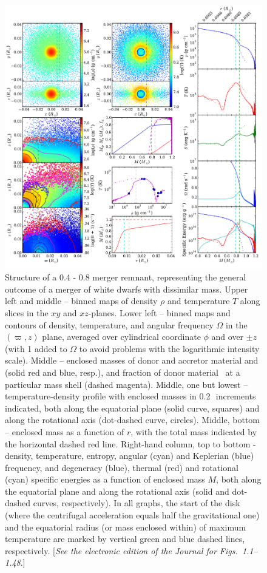 \begin{figure}
\centering
\includegraphics[width=1.0\columnwidth]{chapter2_zhu+13/figures/pt4pt8.pdf}
\caption{Structure of a 0.4 - 0.8 {\Msun} merger remnant, representing the general outcome of a merger of white dwarfs with dissimilar mass.  Upper left and middle -- binned maps of density $\rho$ and temperature $T$ along slices in the $xy$ and $xz$-planes.  Lower left -- binned maps and contours of density, temperature, and angular frequency $\Omega$ in the $(\varpi,z)$ plane, averaged over cylindrical coordinate $\phi$ and over $\pm z$ (with 1 added to $\Omega$ to avoid problems with the logarithmic intensity scale).  Middle -- enclosed masses of donor and accretor material {\Md} and {\Ma} (solid red and blue, resp.), and fraction of donor material \fdon\ at a particular mass shell (dashed magenta).  Middle, one but lowest -- temperature-density profile with enclosed masses in 0.2\,\Msun\ increments indicated, both along the equatorial plane (solid curve, squares) and along the rotational axis (dot-dashed curve, circles).  Middle, bottom -- enclosed mass as a function of $r$, with the total mass indicated by the horizontal dashed red line.  Right-hand column, top to bottom - density, temperature, entropy, angular (cyan) and Keplerian (blue) frequency, and degeneracy (blue), thermal (red) and rotational (cyan) specific energies as a function of enclosed mass $M$, both along the equatorial plane and along the rotational axis (solid and dot-dashed curves, respectively).  In all graphs, the start of the disk (where the centrifugal acceleration equals half the gravitational one) and the equatorial radius (or mass enclosed within) of maximum temperature are marked by vertical green and blue dashed lines, respectively. [{\em See the electronic edition of the Journal for Figs.~1.1--1.48}.]}
\label{fig:c2_mergersampling1}
\end{figure}

